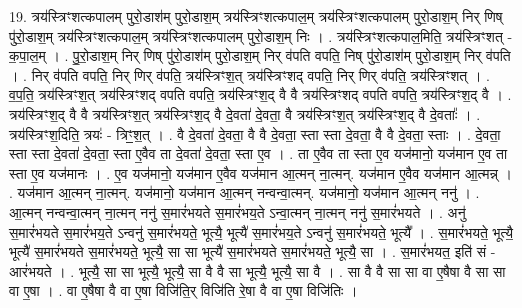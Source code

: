 \documentclass[17pt]{extarticle}
\begin{document}
19. त्रय॑स्त्रिꣳशत्कपालम् पुरो॒डाश॑म् पुरो॒डाश॒म् त्रय॑स्त्रिꣳशत्कपाल॒म् त्रय॑स्त्रिꣳशत्कपालम् पुरो॒डाश॒म् निर् णिष् पु॑रो॒डाश॒म् त्रय॑स्त्रिꣳशत्कपाल॒म् त्रय॑स्त्रिꣳशत्कपालम् पुरो॒डाश॒म् निः । . त्रय॑स्त्रिꣳशत्कपाल॒मिति॒ त्रय॑स्त्रिꣳशत् - क॒पा॒ल॒म् । . पु॒रो॒डाश॒म् निर् णिष् पु॑रो॒डाश॑म् पुरो॒डाश॒म् निर् व॑पति वपति॒ निष् पु॑रो॒डाश॑म् पुरो॒डाश॒म् निर् व॑पति । . निर् व॑पति वपति॒ निर् णिर् व॑पति॒ त्रय॑स्त्रिꣳश॒त् त्रय॑स्त्रिꣳशद् वपति॒ निर् णिर् व॑पति॒ त्रय॑स्त्रिꣳशत् । . व॒प॒ति॒ त्रय॑स्त्रिꣳश॒त् त्रय॑स्त्रिꣳशद् वपति वपति॒ त्रय॑स्त्रिꣳश॒द् वै वै त्रय॑स्त्रिꣳशद् वपति वपति॒ त्रय॑स्त्रिꣳश॒द् वै । . त्रय॑स्त्रिꣳश॒द् वै वै त्रय॑स्त्रिꣳश॒त् त्रय॑स्त्रिꣳश॒द् वै दे॒वता॑ दे॒वता॒ वै त्रय॑स्त्रिꣳश॒त् त्रय॑स्त्रिꣳश॒द् वै दे॒वताः᳚ । . त्रय॑स्त्रिꣳश॒दिति॒ त्रयः॑ - त्रिꣳ॒॒श॒त् । . वै दे॒वता॑ दे॒वता॒ वै वै दे॒वता॒ स्ता स्ता दे॒वता॒ वै वै दे॒वता॒ स्ताः । . दे॒वता॒ स्ता स्ता दे॒वता॑ दे॒वता॒ स्ता ए॒वैव ता दे॒वता॑ दे॒वता॒ स्ता ए॒व । . ता ए॒वैव ता स्ता ए॒व यज॑मानो॒ यज॑मान ए॒व ता स्ता ए॒व यज॑मानः । . ए॒व यज॑मानो॒ यज॑मान ए॒वैव यज॑मान आ॒त्मन् ना॒त्मन्. यज॑मान ए॒वैव यज॑मान आ॒त्मन्न् । . यज॑मान आ॒त्मन् ना॒त्मन्. यज॑मानो॒ यज॑मान आ॒त्मन् नन्वन्वा॒त्मन्. यज॑मानो॒ यज॑मान आ॒त्मन् ननु॑ । . आ॒त्मन् नन्वन्वा॒त्मन् ना॒त्मन् ननु॑ स॒मारं॑भयते स॒मारं॑भय॒ते ऽन्वा॒त्मन् ना॒त्मन् ननु॑ स॒मारं॑भयते । . अनु॑ स॒मारं॑भयते स॒मारं॑भय॒ते ऽन्वनु॑ स॒मारं॑भयते॒ भूत्यै॒ भूत्यै॑ स॒मारं॑भय॒ते ऽन्वनु॑ स॒मारं॑भयते॒ भूत्यै᳚ । . स॒मारं॑भयते॒ भूत्यै॒ भूत्यै॑ स॒मारं॑भयते स॒मारं॑भयते॒ भूत्यै॒ सा सा भूत्यै॑ स॒मारं॑भयते स॒मारं॑भयते॒ भूत्यै॒ सा । . स॒मारं॑भयत॒ इति॑ सं - आरं॑भयते । . भूत्यै॒ सा सा भूत्यै॒ भूत्यै॒ सा वै वै सा भूत्यै॒ भूत्यै॒ सा वै । . सा वै वै सा सा वा ए॒षैषा वै सा सा वा ए॒षा । . वा ए॒षैषा वै वा ए॒षा विजि॑ति॒र् विजि॑ति रे॒षा वै वा ए॒षा विजि॑तिः । \newline
\end{document}
